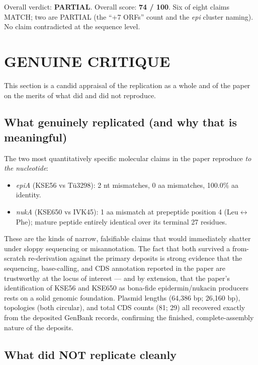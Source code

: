 \documentclass[11pt,letterpaper]{article}
\begin{document}
Overall verdict: \textbf{PARTIAL}. Overall score: \textbf{74 / 100}. Six of eight claims MATCH; two are PARTIAL (the ``+7 ORFs'' count and the \textit{epi} cluster naming). No claim contradicted at the sequence level.

\section{GENUINE CRITIQUE}

This section is a candid appraisal of the replication as a whole and of the paper on the merits of what did and did not reproduce.

\subsection{What genuinely replicated (and why that is meaningful)}

The two most quantitatively specific molecular claims in the paper reproduce \emph{to the nucleotide}:
\begin{itemize}
  \item \textit{epiA} (KSE56 vs T\"u3298): 2 nt mismatches, 0 aa mismatches, 100.0\% aa identity.
  \item \textit{nukA} (KSE650 vs IVK45): 1 aa mismatch at prepeptide position 4 (Leu$\leftrightarrow$Phe); mature peptide entirely identical over its terminal 27 residues.
\end{itemize}
These are the kinds of narrow, falsifiable claims that would immediately shatter under sloppy sequencing or misannotation. The fact that both survived a from-scratch re-derivation against the primary deposits is strong evidence that the sequencing, base-calling, and CDS annotation reported in the paper are trustworthy at the locus of interest --- and by extension, that the paper's identification of KSE56 and KSE650 as bona-fide epidermin/nukacin producers rests on a solid genomic foundation. Plasmid lengths (64{,}386 bp; 26{,}160 bp), topologies (both circular), and total CDS counts (81; 29) all recovered exactly from the deposited GenBank records, confirming the finished, complete-assembly nature of the deposits.

\subsection{What did NOT replicate cleanly}
\end{document}
